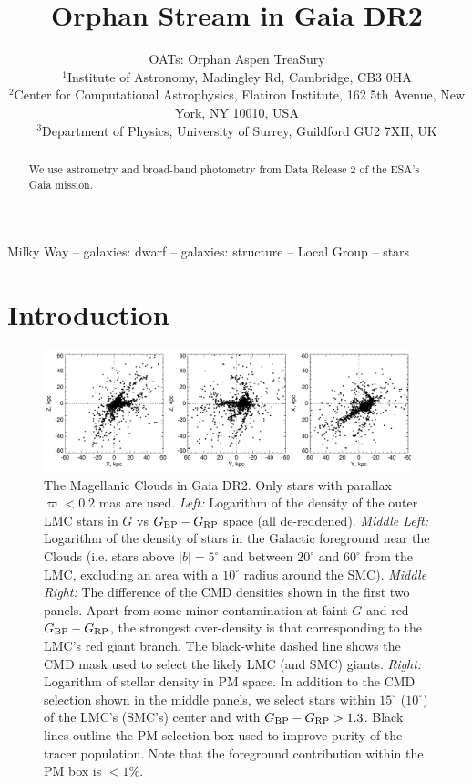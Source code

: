 \documentclass[a4paper,useAMS,usenatbib]{mnras}
\title[Orphan Stream in Gaia DR2]{Orphan Stream in Gaia DR2}
\author[OATs]{OATs: Orphan Aspen TreaSury\\
  $^{1}$Institute of Astronomy, Madingley Rd, Cambridge, CB3 0HA\\
  $^{2}$Center for Computational Astrophysics, Flatiron Institute, 162 5th Avenue, New York, NY 10010, USA\\
  $^{3}$Department of Physics, University of Surrey, Guildford GU2 7XH, UK\\
}
\begin{document}
\maketitle

\label{firstpage}

\begin{abstract}
We use astrometry and broad-band photometry from Data Release 2 of the
ESA's Gaia mission.

\end{abstract}

\begin{keywords}
Milky Way -- galaxies: dwarf -- galaxies: structure -- Local Group -- stars
\end{keywords}

\section{Introduction}



%
\begin{figure}
  \centering
  \includegraphics[width=0.95\textwidth]{orphan_paper_xyz.pdf}
  \caption[]{The Magellanic Clouds in Gaia DR2. Only stars with
    parallax $\varpi<0.2$ mas are used. {\it Left:} Logarithm of the
    density of the outer LMC stars in $G$ vs $G_{\rm BP}-G_{\rm RP}$
    space (all de-reddened). {\it Middle Left:} Logarithm of the
    density of stars in the Galactic foreground near the Clouds
    (i.e. stars above $|b|=5^{\circ}$ and between $20^{\circ}$ and
    $60^{\circ}$ from the LMC, excluding an area with a $10^{\circ}$
    radius around the SMC). {\it Middle Right:} The difference of the
    CMD densities shown in the first two panels. Apart from some minor
    contamination at faint $G$ and red $G_{\rm BP}-G_{\rm RP}$, the
    strongest over-density is that corresponding to the LMC's red
    giant branch. The black-white dashed line shows the CMD mask used
    to select the likely LMC (and SMC) giants. {\it Right:} Logarithm
    of stellar density in PM space. In addition to the CMD selection
    shown in the middle panels, we select stars within $15^{\circ}$
    ($10^{\circ}$) of the LMC's (SMC's) center and with $G_{\rm
      BP}-G_{\rm RP} > 1.3$. Black lines outline the PM selection box
    used to improve purity of the tracer population. Note that the
    foreground contribution within the PM box is $<1\%$.}
   \label{fig:selection}
\end{figure}
%
\end{document}
